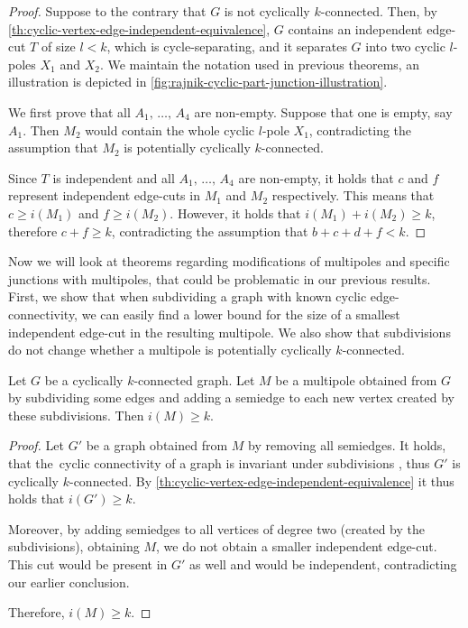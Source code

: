 \documentclass[12pt, twoside]{book}
\begin{document}
\begin{proof}
	Suppose to the contrary that $G$ is not cyclically $k$-connected. Then, by \cref{th:cyclic-vertex-edge-independent-equivalence}, $G$ contains an independent edge-cut $T$ of size $l<k$, which is cycle-separating, and it separates $G$ into two cyclic $l$-poles $X_1$ and $X_2$. We maintain the notation used in previous theorems, an illustration is depicted in \cref{fig:rajnik-cyclic-part-junction-illustration}.
	
	We first prove that all $A_1,\,\dots,\,A_4$ are non-empty. Suppose that one is empty, say $A_1$. Then $M_2$ would contain the whole cyclic $l$-pole $X_1$, contradicting the assumption that $M_2$ is potentially cyclically $k$-connected.
	
	Since $T$ is independent and all $A_1,\,\dots,\,A_4$ are non-empty, it holds that $c$ and $f$ represent independent edge-cuts in $M_1$ and $M_2$ respectively. This means that ${c\geq i(M_1)}$ and ${f\geq i(M_2)}$. However, it holds that ${i(M_1)+i(M_2)\geq k}$, therefore ${c+f\geq k}$, contradicting the assumption that ${b+c+d+f<k}$.
\end{proof}

Now we will look at theorems regarding modifications of multipoles and specific junctions with multipoles, that could be problematic in our previous results. First, we show that when subdividing a graph with known cyclic edge-connectivity, we can easily find a lower bound for the size of a smallest independent edge-cut in the resulting multipole. We also show that subdivisions do not change whether a multipole is potentially cyclically $k$-connected.

\begin{lemma}\label{lem:subdivisions-smallest-independent-cut}
	Let $G$ be a cyclically $k$-connected graph. Let $M$ be a multipole obtained from $G$ by subdividing some edges and adding a semiedge to each new vertex created by these subdivisions. Then $i(M)\geq k$.
\end{lemma}

\begin{proof}
	Let $G'$ be a graph obtained from $M$ by removing all semiedges. It holds, that the~cyclic connectivity of a graph is invariant under subdivisions \cite{atoms-of-cyclic}, thus $G'$ is cyclically $k$-connected. By \cref{th:cyclic-vertex-edge-independent-equivalence} it thus holds that $i(G')\geq k$.
	
	Moreover, by adding semiedges to all vertices of degree two (created by the subdivisions), obtaining $M$, we do not obtain a smaller independent edge-cut. This cut would be present in $G'$ as well and would be independent, contradicting our earlier conclusion.
	
	Therefore, $i(M)\geq k$.
\end{proof}
\end{document}
